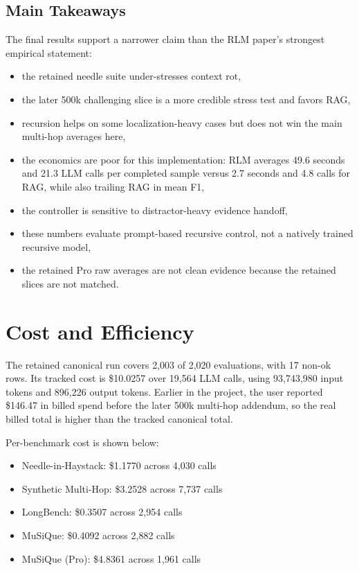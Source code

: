 \documentclass[11pt]{article}
\begin{document}
\subsection{Main Takeaways}
The final results support a narrower claim than the RLM paper's strongest empirical statement:
\begin{itemize}
  \item the retained needle suite under-stresses context rot,
  \item the later 500k challenging slice is a more credible stress test and favors RAG,
  \item recursion helps on some localization-heavy cases but does not win the main multi-hop averages here,
  \item the economics are poor for this implementation: RLM averages 49.6 seconds and 21.3 LLM calls per completed sample versus 2.7 seconds and 4.8 calls for RAG, while also trailing RAG in mean F1,
  \item the controller is sensitive to distractor-heavy evidence handoff,
  \item these numbers evaluate prompt-based recursive control, not a natively trained recursive model,
  \item the retained Pro raw averages are not clean evidence because the retained slices are not matched.
\end{itemize}

\section{Cost and Efficiency}
The retained canonical run covers 2,003 of 2,020 evaluations, with 17 non-ok rows. Its tracked cost is \$10.0257 over 19,564 LLM calls, using 93,743,980 input tokens and 896,226 output tokens. Earlier in the project, the user reported \$146.47 in billed spend before the later 500k multi-hop addendum, so the real billed total is higher than the tracked canonical total.

Per-benchmark cost is shown below:
\begin{itemize}
  \item Needle-in-Haystack: \$1.1770 across 4,030 calls
  \item Synthetic Multi-Hop: \$3.2528 across 7,737 calls
  \item LongBench: \$0.3507 across 2,954 calls
  \item MuSiQue: \$0.4092 across 2,882 calls
  \item MuSiQue (Pro): \$4.8361 across 1,961 calls
\end{itemize}
\end{document}

